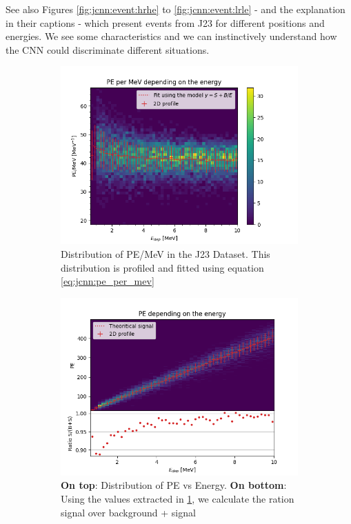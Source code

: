 \documentclass[../main.tex]{subfiles}
\begin{document}
See also Figures \ref{fig:jcnn:event:hrhe} to \ref{fig:jcnn:event:lrle} - and the explanation in their captions -  which present events from J23 for different positions and energies. We see some characteristics and we can instinctively understand how the CNN could discriminate different situations.

\begin{figure}[ht]
  \begin{subfigure}[t]{0.48\linewidth}
    \centering
    \includegraphics[width=\textwidth]{images/jcnn/pe_mev.png}
    \caption{Distribution of PE/MeV in the J23 Dataset. This distribution is profiled and fitted using equation \ref{eq:jcnn:pe_per_mev}}
    \label{fig:jcnn:pe_per_mev}
  \end{subfigure}
  \hfill
  \begin{subfigure}[t]{0.48\linewidth}
    \centering
    \includegraphics[width=\textwidth]{images/jcnn/pe_vs_mev.png}
    \caption{\textbf{On top}: Distribution of PE vs Energy. \textbf{On bottom}: Using the values extracted in \ref{fig:jcnn:pe_per_mev}, we calculate the ration signal over background + signal}
    \label{fig:jcnn:pe_vs_mev}
  \end{subfigure}
  \caption{}
\end{figure}
\end{document}
